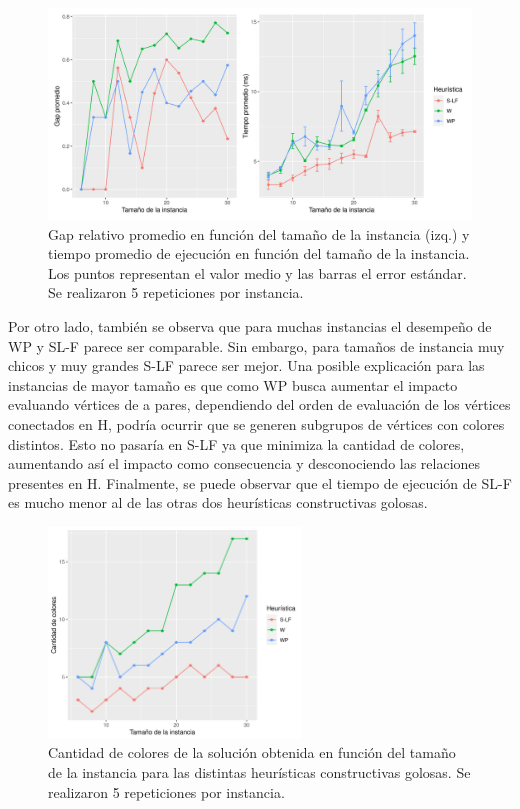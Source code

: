 \begin{figure}[H]
    \centering
    \includegraphics[width=.9\textwidth]{plots/heuristicas_constructivas.png}
    \caption{Gap relativo promedio en función del tamaño de la instancia (izq.) y tiempo promedio de ejecución en función del tamaño de la instancia. Los puntos representan el valor medio y las barras el error estándar. Se realizaron 5 repeticiones por instancia.}
    \label{plot:heuristicas constructivas}
\end{figure}

Por otro lado, también se observa que para muchas instancias el desempeño de WP y SL-F parece ser comparable. Sin embargo, para tamaños de instancia muy chicos y muy grandes S-LF parece ser mejor. Una posible explicación para las instancias de mayor tamaño es que como WP busca aumentar el impacto evaluando vértices de a pares, dependiendo del orden de evaluación de los vértices conectados en H, podría ocurrir que se generen subgrupos de vértices con colores distintos. Esto no pasaría en S-LF ya que minimiza la cantidad de colores, aumentando así el impacto como consecuencia y desconociendo las relaciones presentes en H. Finalmente, se puede observar que el tiempo de ejecución de SL-F es mucho menor al de las otras dos heurísticas constructivas golosas. 

\begin{figure}[H]
    \centering
    \includegraphics[width=0.6\textwidth]{plots/heuristicas_constructivas_colores.png}
    \caption{Cantidad de colores de la solución obtenida en función del tamaño de la instancia para las distintas heurísticas constructivas golosas. Se realizaron 5 repeticiones por instancia.}
    \label{plot:heuristicas constructivas colores}
\end{figure}

